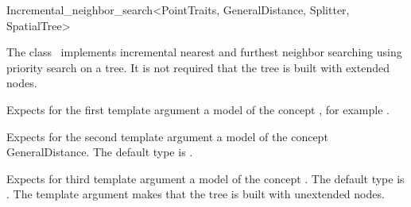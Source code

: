 

\begin{ccRefClass}{Incremental_neighbor_search<PointTraits, GeneralDistance, Splitter, SpatialTree>}


\ccDefinition

The class \ccRefName\ implements incremental nearest and furthest neighbor searching
using priority search on a tree. It is not required that the tree is
built with extended nodes.


\ccParameters

Expects for the first template argument a model of the concept ,
for example .

Expects for the second template argument a model of the
concept GeneralDistance. The default type is 
.


Expects for third template argument a model of the concept .
The default type is . The 
template argument  makes that the tree is built with unextended nodes.

\ccTypes






\end{ccRefClass}

